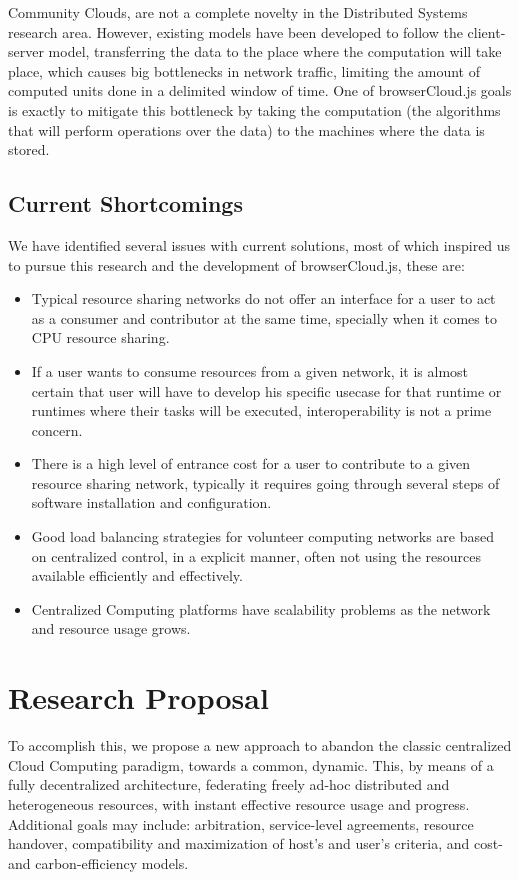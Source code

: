 Community Clouds\cite{Barraca2011}\cite{Navarro}, are not a complete novelty in the Distributed Systems research area. However, existing models have been developed to follow the client-server model, transferring the data to the place where the computation will take place, which causes big bottlenecks in network traffic, limiting the amount of computed units done in a delimited window of time. One of browserCloud.js goals is exactly to mitigate this bottleneck by taking the computation (the algorithms that will perform operations over the data) to the machines where the data is stored.


\subsection{Current Shortcomings}

We have identified several issues with current solutions, most of which inspired us to pursue this research and the development of browserCloud.js, these are:

\begin{itemize}
    \item Typical resource sharing networks do not offer an interface for a user to act as a consumer and contributor at the same time, specially when it comes to CPU resource sharing.
    \item If a user wants to consume resources from a given network, it is almost certain that user will have to develop his specific usecase for that runtime or runtimes where their tasks will be executed, interoperability is not a prime concern.
    \item There is a high level of entrance cost for a user to contribute to a given resource sharing network, typically it requires going through several steps of software installation and configuration.
    \item Good load balancing strategies for volunteer computing networks are based on centralized control, in a explicit manner, often not using the resources available efficiently and effectively.
    \item Centralized Computing platforms have scalability problems as the network and resource usage grows.
\end{itemize}

\section{Research Proposal}

To accomplish this, we propose a new approach to abandon the classic centralized Cloud Computing paradigm, towards a common, dynamic. This, by means of a fully decentralized architecture, federating freely ad-hoc distributed and heterogeneous resources, with instant effective resource usage and progress. Additional goals may include: arbitration, service-level agreements, resource handover, compatibility and maximization of host's and user's criteria, and cost- and carbon-efficiency models.

